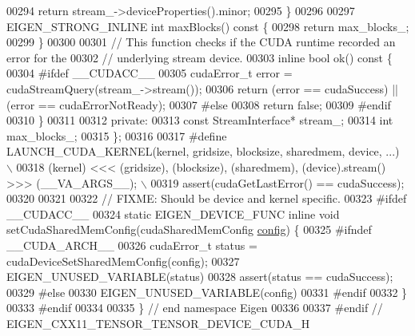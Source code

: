 \begin{DoxyCode}
00294     \textcolor{keywordflow}{return} stream\_->deviceProperties().minor;
00295   \}
00296 
00297   EIGEN\_STRONG\_INLINE \textcolor{keywordtype}{int} maxBlocks()\textcolor{keyword}{ const }\{
00298     \textcolor{keywordflow}{return} max\_blocks\_;
00299   \}
00300 
00301   \textcolor{comment}{// This function checks if the CUDA runtime recorded an error for the}
00302   \textcolor{comment}{// underlying stream device.}
00303   \textcolor{keyword}{inline} \textcolor{keywordtype}{bool} ok()\textcolor{keyword}{ const }\{
00304 \textcolor{preprocessor}{#ifdef \_\_CUDACC\_\_}
00305     cudaError\_t error = cudaStreamQuery(stream\_->stream());
00306     \textcolor{keywordflow}{return} (error == cudaSuccess) || (error == cudaErrorNotReady);
00307 \textcolor{preprocessor}{#else}
00308     \textcolor{keywordflow}{return} \textcolor{keyword}{false};
00309 \textcolor{preprocessor}{#endif}
00310   \}
00311 
00312  \textcolor{keyword}{private}:
00313   \textcolor{keyword}{const} StreamInterface* stream\_;
00314   \textcolor{keywordtype}{int} max\_blocks\_;
00315 \};
00316 
00317 \textcolor{preprocessor}{#define LAUNCH\_CUDA\_KERNEL(kernel, gridsize, blocksize, sharedmem, device, ...)             \(\backslash\)}
00318 \textcolor{preprocessor}{  (kernel) <<< (gridsize), (blocksize), (sharedmem), (device).stream() >>> (\_\_VA\_ARGS\_\_);   \(\backslash\)}
00319 \textcolor{preprocessor}{  assert(cudaGetLastError() == cudaSuccess);}
00320 
00321 
00322 \textcolor{comment}{// FIXME: Should be device and kernel specific.}
00323 \textcolor{preprocessor}{#ifdef \_\_CUDACC\_\_}
00324 \textcolor{keyword}{static} EIGEN\_DEVICE\_FUNC \textcolor{keyword}{inline} \textcolor{keywordtype}{void} setCudaSharedMemConfig(cudaSharedMemConfig 
      \hyperlink{structconfig__s}{config}) \{
00325 \textcolor{preprocessor}{#ifndef \_\_CUDA\_ARCH\_\_}
00326   cudaError\_t status = cudaDeviceSetSharedMemConfig(config);
00327   EIGEN\_UNUSED\_VARIABLE(status)
00328   assert(status == cudaSuccess);
00329 \textcolor{preprocessor}{#else}
00330   EIGEN\_UNUSED\_VARIABLE(config)
00331 \textcolor{preprocessor}{#endif}
00332 \}
00333 \textcolor{preprocessor}{#endif}
00334 
00335 \}  \textcolor{comment}{// end namespace Eigen}
00336 
00337 \textcolor{preprocessor}{#endif  // EIGEN\_CXX11\_TENSOR\_TENSOR\_DEVICE\_CUDA\_H}
\end{DoxyCode}
